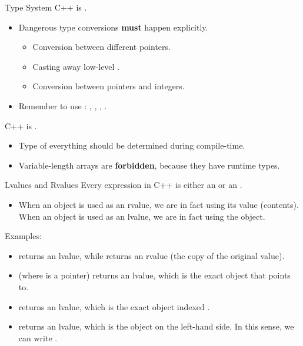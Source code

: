 \documentclass{beamer}
\begin{document}
\begin{frame}{Type System}
    C++ is .
    \begin{itemize}
        \item Dangerous type conversions \textbf{must} happen explicitly.
        \pause
        \begin{itemize}
            \item Conversion between different pointers.
            \item Casting away low-level .
            \item Conversion between pointers and integers.
        \end{itemize}
        \pause
        \item Remember to use : , , , .
    \end{itemize}
    \pause
    C++ is .
    \begin{itemize}
        \item Type of everything should be determined during compile-time.
        \item Variable-length arrays are \textbf{forbidden}, because they have runtime types.
    \end{itemize}
\end{frame}

\begin{frame}{Lvalues and Rvalues}
    Every expression in C++ is either an  or an .
    \begin{itemize}
        \item When an object is used as an rvalue, we are in fact using its value (contents). When an object is used as an lvalue, we are in fact using the object.
    \end{itemize}
    \pause
    Examples:
    \begin{itemize}
        \item {} returns an lvalue, while  returns an rvalue (the copy of the original value).
        \pause
        \item {} (where  is a pointer) returns an lvalue, which is the exact object that  points to.
        \item {} returns an lvalue, which is the exact object indexed .
        \pause
        \item {} returns an lvalue, which is the object on the left-hand side. In this sense, we can write .
    \end{itemize}
\end{frame}
\end{document}
